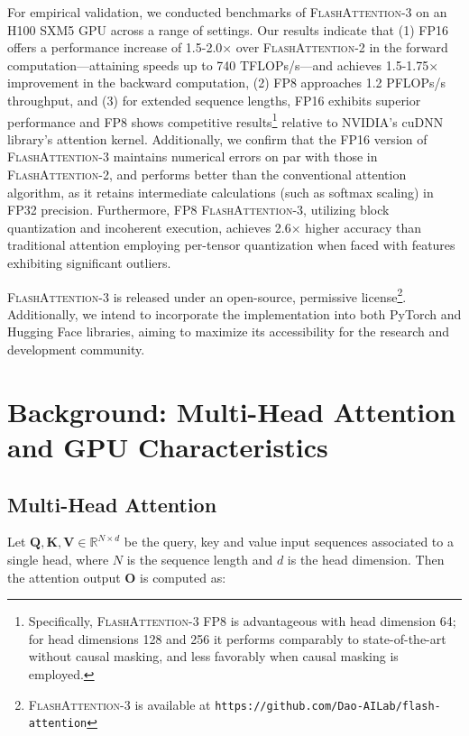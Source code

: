For empirical validation, we conducted benchmarks of \textsc{FlashAttention-3} on an H100 SXM5 GPU across a range of settings. Our results indicate that (1) FP16 offers a performance increase of 1.5-2.0$\times$ over \textsc{FlashAttention-2} in the forward computation—attaining speeds up to 740 TFLOPs/s—and achieves 1.5-1.75$\times$ improvement in the backward computation, (2) FP8 approaches 1.2 PFLOPs/s throughput, and (3) for extended sequence lengths, FP16 exhibits superior performance and FP8 shows competitive results\footnote{Specifically, \textsc{FlashAttention-3} FP8 is advantageous with head dimension 64; for head dimensions 128 and 256 it performs comparably to state-of-the-art without causal masking, and less favorably when causal masking is employed.} relative to NVIDIA's cuDNN library's attention kernel. Additionally, we confirm that the FP16 version of \textsc{FlashAttention-3} maintains numerical errors on par with those in \textsc{FlashAttention-2}, and performs better than the conventional attention algorithm, as it retains intermediate calculations (such as softmax scaling) in FP32 precision. Furthermore, FP8 \textsc{FlashAttention-3}, utilizing block quantization and incoherent execution, achieves 2.6$\times$ higher accuracy than traditional attention employing per-tensor quantization when faced with features exhibiting significant outliers.

\textsc{FlashAttention-3} is released under an open-source, permissive license\footnote{\textsc{FlashAttention-3}
  is available at \texttt{https://github.com/Dao-AILab/flash-attention}}. Additionally, we intend to incorporate the implementation into both PyTorch and Hugging Face libraries, aiming to maximize its accessibility for the research and development community.

\section{Background: Multi-Head Attention and GPU Characteristics}
\label{sec:background}

\subsection{Multi-Head Attention}
\label{subsec:multi_head_attn}

Let $\mathbf{Q}, \mathbf{K}, \mathbf{V} \in \mathbb{R}^{N \times d}$ be the query, key and value input sequences associated to a single head, where $N$ is the sequence length and $d$ is the head dimension. Then the attention output $\mathbf{O}$ is computed as:


